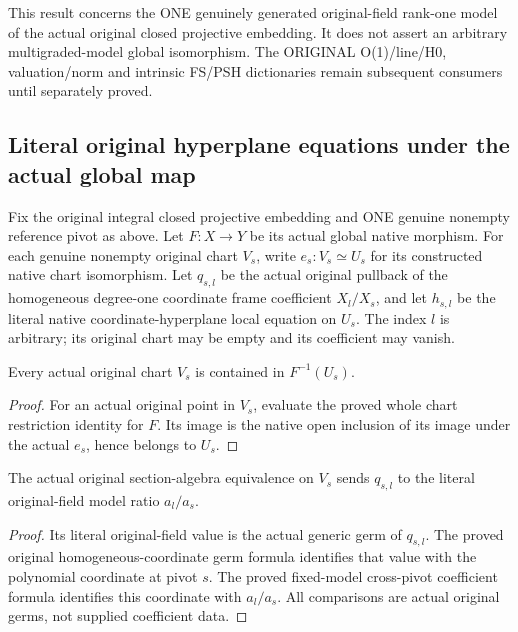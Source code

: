 This result concerns the ONE genuinely generated original-field rank-one
model of the actual original closed projective embedding. It does not
assert an arbitrary multigraded-model global isomorphism. The ORIGINAL
O(1)/line/H0, valuation/norm and intrinsic FS/PSH dictionaries remain
subsequent consumers until separately proved.
\subsection{Literal original hyperplane equations under the actual global map}
Fix the original integral closed projective embedding and ONE genuine
nonempty reference pivot as above. Let $F:X\to Y$ be its actual global
native morphism. For each genuine nonempty original chart $V_s$, write
$e_s:V_s\simeq U_s$ for its constructed native chart isomorphism. Let
$q_{s,l}$ be the actual original pullback of the homogeneous degree-one
coordinate frame coefficient $X_l/X_s$, and let $h_{s,l}$ be the literal
native coordinate-hyperplane local equation on $U_s$. The index $l$ is
arbitrary; its original chart may be empty and its coefficient may vanish.

\begin{lemma}
\label{lem:seven-original-native-hyperplane-chart-containment-route}
\leanok
{}
Every actual original chart $V_s$ is contained in $F^{-1}(U_s)$.
\end{lemma}
\begin{proof}
For an actual original point in $V_s$, evaluate the proved whole chart
restriction identity for $F$. Its image is the native open inclusion of
its image under the actual $e_s$, hence belongs to $U_s$.
\end{proof}

\begin{lemma}
\label{lem:seven-original-native-hyperplane-original-coefficient-route}
\leanok
{}
The actual original section-algebra equivalence on $V_s$ sends $q_{s,l}$
to the literal original-field model ratio $a_l/a_s$.
\end{lemma}
\begin{proof}
Its literal original-field value is the actual generic germ of $q_{s,l}$.
The proved original homogeneous-coordinate germ formula identifies that
value with the polynomial coordinate at pivot $s$. The proved fixed-model
cross-pivot coefficient formula identifies this coordinate with $a_l/a_s$.
All comparisons are actual original germs, not supplied coefficient data.
\end{proof}

